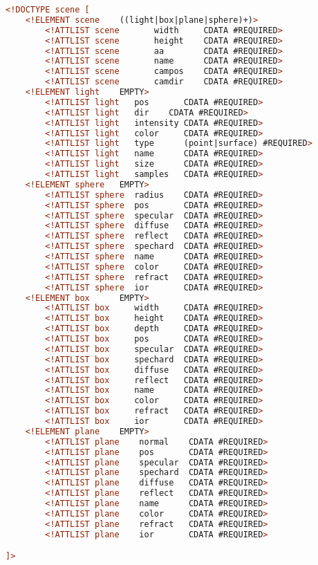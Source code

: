 \documentclass[]{article}
\begin{document}
\begin{lstlisting}[language=XML]
<!DOCTYPE scene [
    <!ELEMENT scene    ((light|box|plane|sphere)+)>
        <!ATTLIST scene       width     CDATA #REQUIRED>
        <!ATTLIST scene       height    CDATA #REQUIRED>
        <!ATTLIST scene       aa        CDATA #REQUIRED> 
        <!ATTLIST scene       name      CDATA #REQUIRED>
        <!ATTLIST scene       campos    CDATA #REQUIRED>
        <!ATTLIST scene       camdir    CDATA #REQUIRED>
    <!ELEMENT light    EMPTY>
        <!ATTLIST light   pos       CDATA #REQUIRED>
        <!ATTLIST light   dir    CDATA #REQUIRED>
        <!ATTLIST light   intensity CDATA #REQUIRED>
        <!ATTLIST light   color     CDATA #REQUIRED>
        <!ATTLIST light   type      (point|surface) #REQUIRED>
        <!ATTLIST light   name      CDATA #REQUIRED>
        <!ATTLIST light   size      CDATA #REQUIRED>        
        <!ATTLIST light   samples   CDATA #REQUIRED>
    <!ELEMENT sphere   EMPTY>
        <!ATTLIST sphere  radius    CDATA #REQUIRED>
        <!ATTLIST sphere  pos       CDATA #REQUIRED>
        <!ATTLIST sphere  specular  CDATA #REQUIRED>
        <!ATTLIST sphere  diffuse   CDATA #REQUIRED>
        <!ATTLIST sphere  reflect   CDATA #REQUIRED>
        <!ATTLIST sphere  spechard  CDATA #REQUIRED>
        <!ATTLIST sphere  name      CDATA #REQUIRED>
        <!ATTLIST sphere  color     CDATA #REQUIRED>
        <!ATTLIST sphere  refract   CDATA #REQUIRED>
        <!ATTLIST sphere  ior       CDATA #REQUIRED>
    <!ELEMENT box      EMPTY>
        <!ATTLIST box     width     CDATA #REQUIRED>
        <!ATTLIST box     height    CDATA #REQUIRED>
        <!ATTLIST box     depth     CDATA #REQUIRED>
        <!ATTLIST box     pos       CDATA #REQUIRED>
        <!ATTLIST box     specular  CDATA #REQUIRED>
        <!ATTLIST box     spechard  CDATA #REQUIRED>
        <!ATTLIST box     diffuse   CDATA #REQUIRED>
        <!ATTLIST box     reflect   CDATA #REQUIRED>
        <!ATTLIST box     name      CDATA #REQUIRED>
        <!ATTLIST box     color     CDATA #REQUIRED>
        <!ATTLIST box     refract   CDATA #REQUIRED>
        <!ATTLIST box     ior       CDATA #REQUIRED>
    <!ELEMENT plane    EMPTY>
        <!ATTLIST plane    normal    CDATA #REQUIRED>
        <!ATTLIST plane    pos       CDATA #REQUIRED>
        <!ATTLIST plane    specular  CDATA #REQUIRED>
        <!ATTLIST plane    spechard  CDATA #REQUIRED>
        <!ATTLIST plane    diffuse   CDATA #REQUIRED>
        <!ATTLIST plane    reflect   CDATA #REQUIRED>
        <!ATTLIST plane    name      CDATA #REQUIRED>
        <!ATTLIST plane    color     CDATA #REQUIRED>
        <!ATTLIST plane    refract   CDATA #REQUIRED>
        <!ATTLIST plane    ior       CDATA #REQUIRED>

]>
\end{lstlisting}
\end{document}
